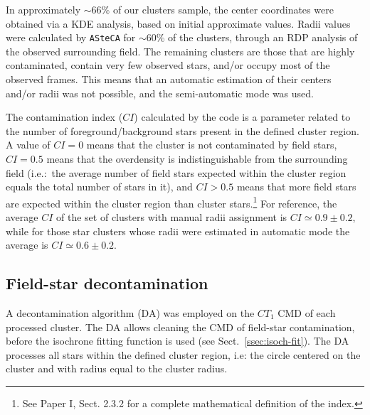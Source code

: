 \documentclass{aa}
\begin{document}
In approximately ${\sim}66\%$ of our clusters sample, the center coordinates
were obtained via a KDE analysis, based on initial approximate values. Radii
values were calculated by \texttt{ASteCA} for ${\sim}60\%$ of the clusters, through
an RDP analysis of the observed surrounding field.
%
The remaining clusters are those that are highly contaminated, contain very few
observed stars, and/or occupy most of the observed frames. This means that an
automatic estimation of their centers and/or radii was not possible, and the
semi-automatic mode was used.

The contamination index ($CI$) calculated by the code is a parameter related to
the number of foreground/background stars present in the defined cluster region.
A value of $CI{=}0$ means that the cluster is not contaminated by field stars,
$CI{=}0.5$ means that the overdensity is indistinguishable from the surrounding
field (i.e.:\ the average number of field stars expected within the cluster
region equals the total number of stars in it), and $CI{>}0.5$ means that more
field stars are expected within the cluster region than cluster
stars.\footnote{See Paper I, Sect. 2.3.2 for a complete mathematical
definition of the index.}
%
For reference, the average $CI$ of the set of clusters with manual radii
assignment is $CI{\simeq}0.9{\pm}0.2$, while for those star clusters whose
radii were estimated in automatic mode the average is $CI{\simeq}0.6\pm0.2$.



\subsection{Field-star decontamination}
\label{ssec:dencontamination}

A decontamination algorithm (DA) was employed on the $CT_1$ CMD of each
processed cluster. The DA allows cleaning the CMD of field-star contamination,
before the isochrone fitting function is used (see Sect.~\ref{ssec:isoch-fit}).
The DA processes all stars within the defined cluster region, i.e: the circle
centered on the cluster and with radius equal to the cluster radius.
\end{document}

